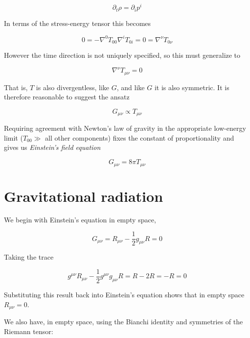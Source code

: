 \begin{equation*}
\partial_t \rho = \partial_i p^i
\end{equation*}

In terms of the stress-energy tensor this becomes

\begin{equation*}
0 = - \nabla^0 T_{00} \nabla^i T_{0i} = 0
= \nabla^\nu T_{0 \nu}
\end{equation*}

However the time direction is not uniquely specified, so this 
must generalize to

\begin{equation*}
\nabla^\nu T_{\mu\nu} = 0
\end{equation*}

That is, $T$ is also divergentless, like $G$, and like $G$ it is also
symmetric.  It is therefore reasonable to suggest the ansatz

\begin{equation*}
G_{\mu\nu} \propto T_{\mu\nu}
\end{equation*}

Requiring agreement with Newton's law of gravity in the appropriate
low-energy limit ($T_{00} \gg$ all other components) fixes the
constant of proportionality and gives us \emph{Einstein's field
equation}

\begin{equation}
G_{\mu\nu} = 8\pi T_{\mu\nu}
\end{equation}


\section{Gravitational radiation}

We begin with Einstein's equation in empty space,

\begin{equation*}
G_{\mu\nu} = R_{\mu\nu} - \frac{1}{2} g_{\mu\nu} R = 0
\end{equation*}

Taking the trace

\begin{equation*}
g^{\mu\nu} R_{\mu\nu} - \frac{1}{2} g^{\mu\nu} g_{\mu\nu} R 
= R - 2 R = -R = 0
\end{equation*}

Substituting this result back into Einstein's equation shows that in
empty space $R_{\mu\nu} = 0$.

We also have, in empty space, using the Bianchi identity and
symmetries of the Riemann tensor:

